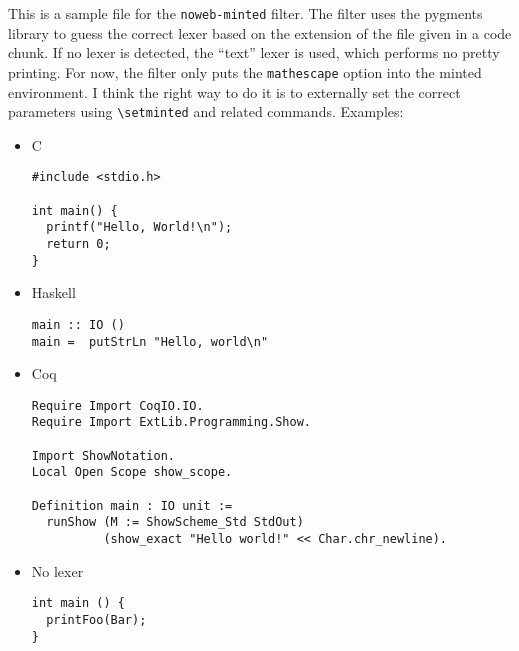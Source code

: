 \documentclass{article}
\begin{document}
This is a sample file for the {\tt{}noweb-minted} filter. The filter uses
the pygments library to guess the correct lexer based on the extension
of the file given in a code chunk. If no lexer is detected, the
``text'' lexer is used, which performs no pretty printing. For now,
the filter only puts the {\tt mathescape} option into the minted
environment. I think the right way to do it is to externally set the
correct parameters using {\tt \textbackslash{setminted}} and related
commands. Examples:

\begin{itemize}
\item C

\endmoddef
\begin{verbatim}
#include <stdio.h>

int main() {
  printf("Hello, World!\n");
  return 0;    
}

\end{verbatim}
\nwdocspar

\item Haskell

\nwenddocs{}\endmoddef
\begin{verbatim}
main :: IO ()
main =  putStrLn "Hello, world\n"

\end{verbatim}
\nwdocspar

\item Coq

\nwenddocs{}\endmoddef
\begin{verbatim}
Require Import CoqIO.IO.
Require Import ExtLib.Programming.Show.

Import ShowNotation.
Local Open Scope show_scope.

Definition main : IO unit :=
  runShow (M := ShowScheme_Std StdOut) 
          (show_exact "Hello world!" << Char.chr_newline).

\end{verbatim}
\nwdocspar

\item No lexer

\nwenddocs{}\endmoddef
\begin{verbatim}
int main () {
  printFoo(Bar);
}

\end{verbatim}
\nwdocspar

\end{itemize}
\end{document}
